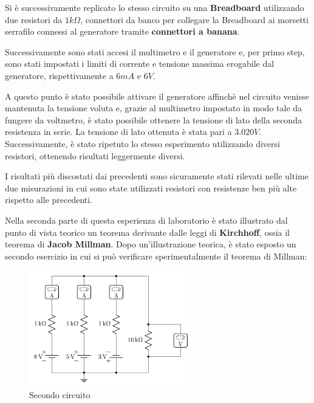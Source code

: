     Si è successivamente replicato lo stesso circuito su una \textbf{Breadboard} utilizzando due resistori da
    $1k\Omega$, connettori da banco per collegare la Breadboard ai morsetti serrafilo connessi al generatore
    tramite \textbf{connettori a banana}. \par
    Successivamente sono stati accesi il multimetro e il generatore e, per primo step, sono stati impostati i limiti di corrente e tensione massima
    erogabile dal generatore, rispettivamente a $6mA$ e $6V$.\par
    A questo punto è stato possibile attivare il generatore affinchè nel circuito venisse mantenuta la tensione voluta e,
    grazie al multimetro impostato in modo tale da fungere da voltmetro, è stato possibile ottenere la tensione di lato della
    seconda resistenza in serie. La tensione di lato ottenuta è stata pari a $3.020V$.
    Successivamente, è stato ripetuto lo stesso esperimento utilizzando diversi resistori, ottenendo risultati leggermente diversi.\par
    I risultati più discostati dai precedenti sono sicuramente stati rilevati nelle ultime due misurazioni in cui sono state utilizzati
    resistori con resistenze ben più alte rispetto alle precedenti.\par
    \par
    Nella seconda parte di questa esperienza di laboratorio è stato illustrato dal punto di vista teorico
    un teorema derivante dalle leggi di \textbf{Kirchhoff}, ossia il teorema di \textbf{Jacob Millman}.
    Dopo un'illustrazione teorica, è stato esposto un secondo esercizio in cui si può verificare sperimentalmente il teorema di Millman:
    
    \begin{figure}[!h]
        \begin{center}
            \includegraphics[width = 7cm]{ese2.png}
            \caption{Secondo circuito}
        \end{center}
    \end{figure}

